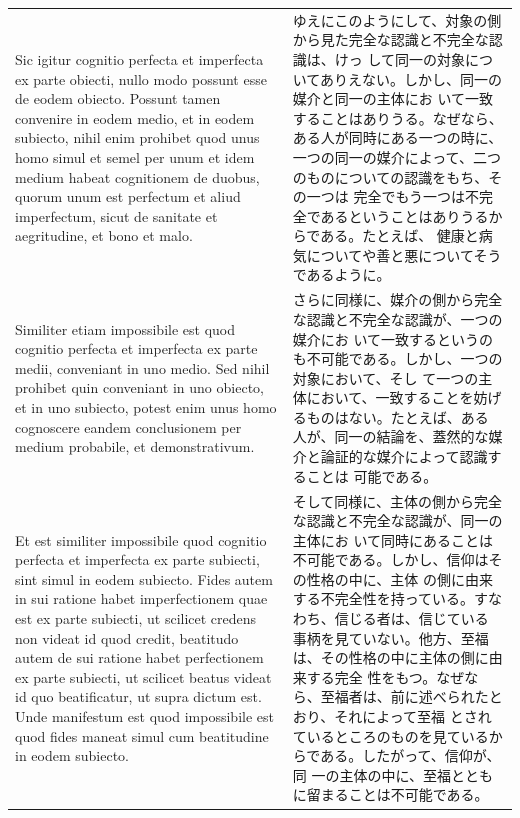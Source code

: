 \documentclass[paper=a4paper,fontsize=10pt,jafontsize=9pt,titlepage]{jlreq}
\begin{document}
\begin{longtable}{p{21em}p{21em}}
\\

 Sic igitur cognitio perfecta et imperfecta ex parte obiecti, nullo
 modo possunt esse de eodem obiecto. Possunt tamen convenire in eodem
 medio, et in eodem subiecto, nihil enim prohibet quod unus homo simul
 et semel per unum et idem medium habeat cognitionem de duobus, quorum
 unum est perfectum et aliud imperfectum, sicut de sanitate et
 aegritudine, et bono et malo.

 &

 ゆえにこのようにして、対象の側から見た完全な認識と不完全な認識は、けっ
 して同一の対象についてありえない。しかし、同一の媒介と同一の主体にお
 いて一致することはありうる。なぜなら、ある人が同時にある一つの時に、
 一つの同一の媒介によって、二つのものについての認識をもち、その一つは
 完全でもう一つは不完全であるということはありうるからである。たとえば、
 健康と病気についてや善と悪についてそうであるように。


\\

 Similiter etiam impossibile est quod cognitio perfecta et imperfecta
 ex parte medii, conveniant in uno medio. Sed nihil prohibet quin
 conveniant in uno obiecto, et in uno subiecto, potest enim unus homo
 cognoscere eandem conclusionem per medium probabile, et
 demonstrativum.
 
&

 さらに同様に、媒介の側から完全な認識と不完全な認識が、一つの媒介にお
 いて一致するというのも不可能である。しかし、一つの対象において、そし
 て一つの主体において、一致することを妨げるものはない。たとえば、ある
 人が、同一の結論を、蓋然的な媒介と論証的な媒介によって認識することは
 可能である。

\\

 Et est similiter impossibile quod cognitio perfecta et imperfecta ex
 parte subiecti, sint simul in eodem subiecto. Fides autem in sui
 ratione habet imperfectionem quae est ex parte subiecti, ut scilicet
 credens non videat id quod credit, beatitudo autem de sui ratione
 habet perfectionem ex parte subiecti, ut scilicet beatus videat id
 quo beatificatur, ut supra dictum est. Unde manifestum est quod
 impossibile est quod fides maneat simul cum beatitudine in eodem
 subiecto.

 &

 そして同様に、主体の側から完全な認識と不完全な認識が、同一の主体にお
 いて同時にあることは不可能である。しかし、信仰はその性格の中に、主体
 の側に由来する不完全性を持っている。すなわち、信じる者は、信じている
 事柄を見ていない。他方、至福は、その性格の中に主体の側に由来する完全
 性をもつ。なぜなら、至福者は、前に述べられたとおり、それによって至福
 とされているところのものを見ているからである。したがって、信仰が、同
 一の主体の中に、至福とともに留まることは不可能である。



\end{longtable}
\end{document}
